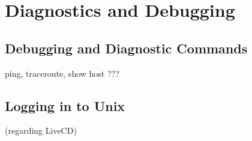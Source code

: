 \chapter{Diagnostics and Debugging}

\section{Debugging and Diagnostic Commands}

ping, traceroute, show host ???

\section{Logging in to Unix}

(regarding LiveCD)